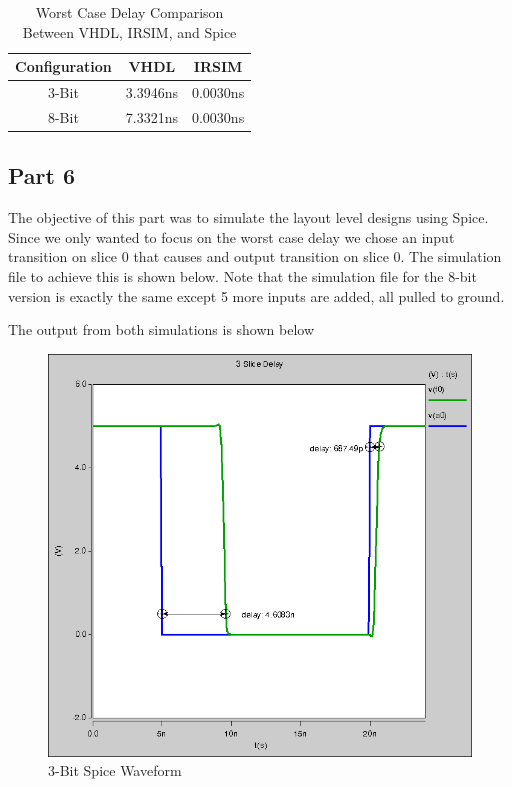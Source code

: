 \documentclass{article}
\begin{document}
\begin{table}[H]
    \centering
    \begin{tabular}{ccc}
        \toprule
        \textbf{Configuration} & \textbf{VHDL} & \textbf{IRSIM} \\
        \midrule
        3-Bit & 3.3946ns & 0.0030ns \\
        8-Bit & 7.3321ns & 0.0030ns \\
        \bottomrule
    \end{tabular}
    \caption{Worst Case Delay Comparison Between VHDL, IRSIM, and Spice}
\end{table}

\subsection*{Part 6}

The objective of this part was to simulate the layout level designs using
Spice. Since we only wanted to focus on the worst case delay we chose an input
transition on slice 0 that causes and output transition on slice 0. The
simulation file to achieve this is shown below. Note that the simulation file
for the 8-bit version is exactly the same except 5 more inputs are added, all
pulled to ground.

\vspace{0.25in}


\newpage
The output from both simulations is shown below

\begin{figure}[H]
    \centering
    \includegraphics[width=0.6\linewidth]{../part_6/fun3.png}
    \caption{3-Bit Spice Waveform}
\end{figure}
\end{document}
